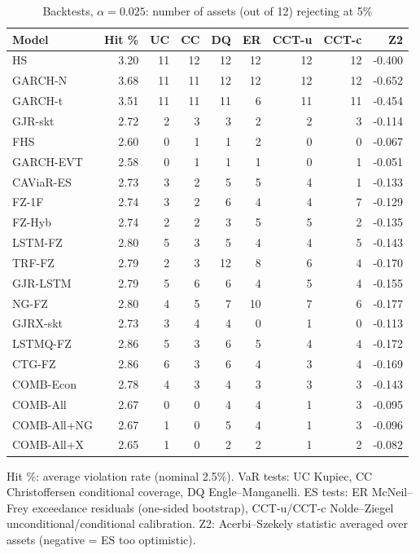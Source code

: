 \begin{table}[htbp]
\centering
\footnotesize
\caption{Backtests, $\alpha=0.025$: number of assets (out of 12) rejecting at 5\%}
\label{tab:bt_a025}
\begin{tabular}{lrrrrrrrr}
\toprule
Model & Hit \% & UC & CC & DQ & ER & CCT-u & CCT-c & Z2 \\
\midrule
HS & 3.20 & 11 & 12 & 12 & 12 & 12 & 12 & -0.400 \\
GARCH-N & 3.68 & 11 & 11 & 12 & 12 & 12 & 12 & -0.652 \\
GARCH-t & 3.51 & 11 & 11 & 11 & 6 & 11 & 11 & -0.454 \\
GJR-skt & 2.72 & 2 & 3 & 3 & 2 & 2 & 3 & -0.114 \\
FHS & 2.60 & 0 & 1 & 1 & 2 & 0 & 0 & -0.067 \\
GARCH-EVT & 2.58 & 0 & 1 & 1 & 1 & 0 & 1 & -0.051 \\
CAViaR-ES & 2.73 & 3 & 2 & 5 & 5 & 4 & 1 & -0.133 \\
FZ-1F & 2.74 & 3 & 2 & 6 & 4 & 4 & 7 & -0.129 \\
FZ-Hyb & 2.74 & 2 & 2 & 3 & 5 & 5 & 2 & -0.135 \\
LSTM-FZ & 2.80 & 5 & 3 & 5 & 4 & 4 & 5 & -0.143 \\
TRF-FZ & 2.79 & 2 & 3 & 12 & 8 & 6 & 4 & -0.170 \\
GJR-LSTM & 2.79 & 5 & 6 & 6 & 4 & 5 & 4 & -0.155 \\
NG-FZ & 2.80 & 4 & 5 & 7 & 10 & 7 & 6 & -0.177 \\
GJRX-skt & 2.73 & 3 & 4 & 4 & 0 & 1 & 0 & -0.113 \\
LSTMQ-FZ & 2.86 & 5 & 3 & 6 & 5 & 4 & 4 & -0.172 \\
CTG-FZ & 2.86 & 6 & 3 & 6 & 4 & 3 & 4 & -0.169 \\
COMB-Econ & 2.78 & 4 & 3 & 4 & 3 & 3 & 3 & -0.143 \\
COMB-All & 2.67 & 0 & 0 & 4 & 4 & 1 & 3 & -0.095 \\
COMB-All+NG & 2.67 & 1 & 0 & 5 & 4 & 1 & 3 & -0.096 \\
COMB-All+X & 2.65 & 1 & 0 & 2 & 2 & 1 & 2 & -0.082 \\
\bottomrule
\end{tabular}
\par\smallskip\parbox{\linewidth}{\scriptsize Hit \%: average violation rate (nominal 2.5\%). VaR tests: UC Kupiec, CC Christoffersen conditional coverage, DQ Engle--Manganelli. ES tests: ER McNeil--Frey exceedance residuals (one-sided bootstrap), CCT-u/CCT-c Nolde--Ziegel unconditional/conditional calibration. Z2: Acerbi--Szekely statistic averaged over assets (negative = ES too optimistic).}
\end{table}